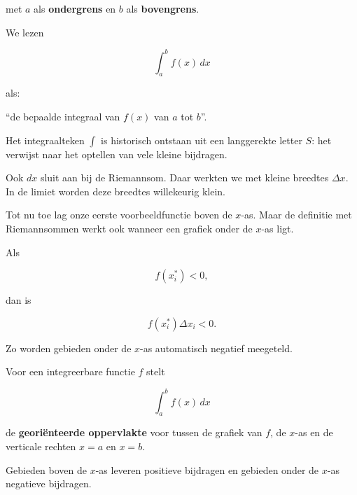 \documentclass{ximera}
\begin{document}
met \(a\) als \textbf{ondergrens} en \(b\) als \textbf{bovengrens}.

We lezen

\[
\int_a^b f(x)\,dx
\]

als:

\begin{center}
``de bepaalde integraal van \(f(x)\) van \(a\) tot \(b\)''.
\end{center}

Het integraalteken \(\int\) is historisch ontstaan uit een langgerekte
letter \(S\): het verwijst naar het optellen van vele kleine bijdragen.

Ook \(dx\) sluit aan bij de Riemannsom. Daar werkten we met kleine
breedtes \(\Delta x\). In de limiet worden deze breedtes willekeurig
klein.




Tot nu toe lag onze eerste voorbeeldfunctie boven de \(x\)-as. Maar de
definitie met Riemannsommen werkt ook wanneer een grafiek onder de
\(x\)-as ligt.

Als

\[
f(x_i^\ast)<0,
\]

dan is

\[
f(x_i^\ast)\Delta x_i<0.
\]

Zo worden gebieden onder de \(x\)-as automatisch negatief meegeteld.

\begin{opmerking}
Voor een integreerbare functie \(f\) stelt

\[
\int_a^b f(x)\,dx
\]

de \textbf{georiënteerde oppervlakte} voor tussen de grafiek van \(f\),
de \(x\)-as en de verticale rechten \(x=a\) en \(x=b\).

Gebieden boven de \(x\)-as leveren positieve bijdragen en gebieden onder
de \(x\)-as negatieve bijdragen.
\end{opmerking}

\begin{center}
\end{center}
\end{document}
